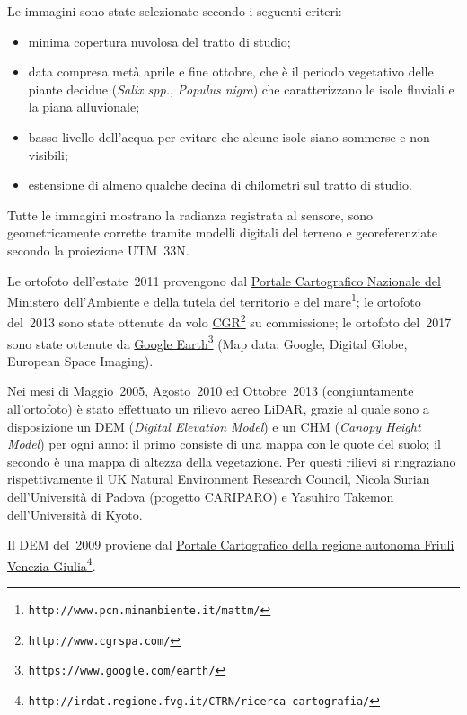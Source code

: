%
Le immagini sono state selezionate secondo i seguenti criteri:
%
\begin{itemize}
	\item minima copertura nuvolosa del tratto di studio;
	\item data compresa metà aprile e fine ottobre, che è il periodo vegetativo delle piante decidue (\emph{Salix spp.}, \emph{Populus nigra}) che caratterizzano le isole fluviali e la piana alluvionale;
	\item basso livello dell'acqua per evitare che alcune isole siano sommerse e non visibili;
	\item estensione di almeno qualche decina di chilometri sul tratto di studio.
\end{itemize}
%
Tutte le immagini mostrano la radianza registrata al sensore, sono geometricamente corrette tramite modelli digitali del terreno e georeferenziate secondo la proiezione UTM~33N.

Le ortofoto dell'estate~2011 provengono dal \href{http://www.pcn.minambiente.it/mattm/}{Portale Cartografico Nazionale del Ministero dell'Ambiente e della tutela del territorio e del mare}\footnote{\texttt{http://www.pcn.minambiente.it/mattm/}};
le ortofoto del~2013 sono state ottenute da volo \href{http://www.cgrspa.com/}{CGR}\footnote{\texttt{http://www.cgrspa.com/}} su commissione; 
le ortofoto del~2017 sono state ottenute da \href{https://www.google.com/earth/}{Google Earth}\footnote{\texttt{https://www.google.com/earth/}} (Map data: Google, Digital Globe, European Space Imaging).

Nei mesi di Maggio~2005, Agosto~2010 ed Ottobre~2013 (congiuntamente all'ortofoto) è stato effettuato un rilievo aereo LiDAR, grazie al quale sono a disposizione un DEM (\emph{Digital Elevation Model}) e un CHM (\emph{Canopy Height Model}) per ogni anno: il primo consiste di una mappa con le quote del suolo; il secondo è una mappa di altezza della vegetazione.
Per questi rilievi si ringraziano rispettivamente il UK Natural Environment Research Council, Nicola Surian dell'Università di Padova (progetto CARIPARO) e Yasuhiro Takemon dell'Università di Kyoto.

Il DEM del~2009 proviene dal \href{http://irdat.regione.fvg.it/CTRN/ricerca-cartografia/}{Portale Cartografico della regione autonoma Friuli Venezia Giulia}\footnote{\texttt{http://irdat.regione.fvg.it/CTRN/ricerca-cartografia/}}.


